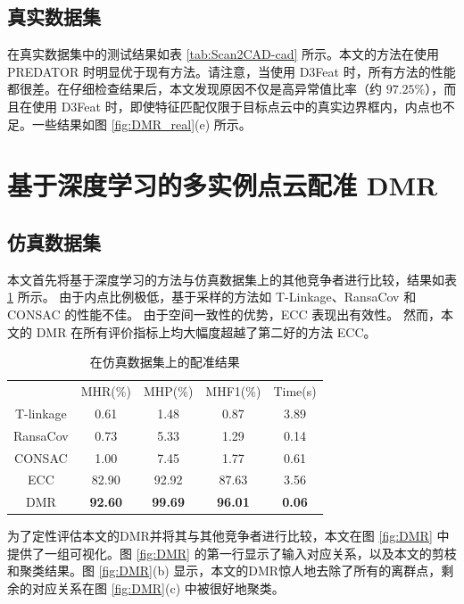 \subsection{真实数据集}
在真实数据集中的测试结果如表 \ref{tab:Scan2CAD-cad} 所示。本文的方法在使用 PREDATOR 时明显优于现有方法。请注意，当使用 D3Feat 时，所有方法的性能都很差。在仔细检查结果后，本文发现原因不仅是高异常值比率（约 $97.25\%$），而且在使用 D3Feat 时，即使特征匹配仅限于目标点云中的真实边界框内，内点也不足。一些结果如图 \ref{fig:DMR_real}(e) 所示。


\section{基于深度学习的多实例点云配准 DMR}
\subsection{仿真数据集}
本文首先将基于深度学习的方法与仿真数据集上的其他竞争者进行比较，结果如表 \ref{table1} 所示。
由于内点比例极低，基于采样的方法如 T-Linkage、RansaCov 和 CONSAC 的性能不佳。
由于空间一致性的优势，ECC 表现出有效性。
然而，本文的 DMR 在所有评价指标上均大幅度超越了第二好的方法 ECC。

\setlength{\tabcolsep}{8pt}
\begin{table}[ht]
  \centering
  \caption{在仿真数据集上的配准结果}
  \begin{tabular}{ccccc}
    \hline\noalign{\smallskip}
  & MHR(\%)         & MHP(\%)         & MHF1(\%)         & Time(s)       \\
  \noalign{\smallskip}
  \hline
  \noalign{\smallskip}
  T-linkage  & 0.61           & 1.48           & 0.87           & 3.89          \\
  RansaCov   & 0.73           & 5.33           & 1.29           & 0.14          \\
  CONSAC     & 1.00           & 7.45           & 1.77           & 0.61          \\
  ECC         & 82.90          & 92.92          & 87.63          & 3.56          \\
  DMR              & \textbf{92.60} & \textbf{99.69} & \textbf{96.01} & \textbf{0.06} \\
  \hline
  \end{tabular}
  \label{table1}
\end{table}

为了定性评估本文的DMR并将其与其他竞争者进行比较，本文在图 \ref{fig:DMR} 中提供了一组可视化。图 \ref{fig:DMR} 的第一行显示了输入对应关系，以及本文的剪枝和聚类结果。图 \ref{fig:DMR}(b) 显示，本文的DMR惊人地去除了所有的离群点，剩余的对应关系在图 \ref{fig:DMR}(c) 中被很好地聚类。

